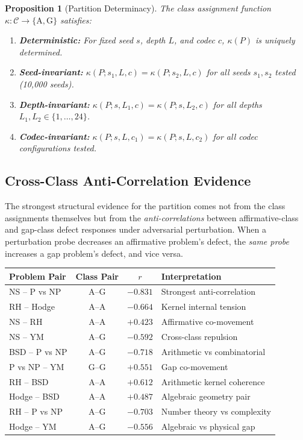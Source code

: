 \documentclass[11pt]{article}
\newtheorem{proposition}[theorem]{Proposition}
\begin{document}
\begin{proposition}[Partition Determinacy]
\label{prop:determinacy}
The class assignment function $\kappa : \mathcal{C} \to
\{\mathrm{A}, \mathrm{G}\}$ satisfies:
\begin{enumerate}
\item \textbf{Deterministic:} For fixed seed $s$, depth $L$, and
codec $c$, $\kappa(P)$ is uniquely determined.
\item \textbf{Seed-invariant:} $\kappa(P; s_1, L, c) = \kappa(P; s_2, L, c)$
for all seeds $s_1, s_2$ tested (10{,}000 seeds).
\item \textbf{Depth-invariant:} $\kappa(P; s, L_1, c) = \kappa(P; s, L_2, c)$
for all depths $L_1, L_2 \in \{1, \ldots, 24\}$.
\item \textbf{Codec-invariant:} $\kappa(P; s, L, c_1) = \kappa(P; s, L, c_2)$
for all codec configurations tested.
\end{enumerate}
\end{proposition}

\subsection{Cross-Class Anti-Correlation Evidence}
\label{subsec:anticorrelation}

The strongest structural evidence for the partition comes not from the
class assignments themselves but from the \emph{anti-correlations}
between affirmative-class and gap-class defect responses under
adversarial perturbation.  When a perturbation probe decreases an
affirmative problem's defect, the \emph{same probe} increases a gap
problem's defect, and vice versa.

\begin{center}
\begin{tabular}{@{}lccl@{}}
\toprule
\textbf{Problem Pair} & \textbf{Class Pair} & $r$ & \textbf{Interpretation} \\
\midrule
NS -- P vs NP     & A--G & $-0.831$ & Strongest anti-correlation \\
RH -- Hodge       & A--A & $-0.664$ & Kernel internal tension \\
NS -- RH          & A--A & $+0.423$ & Affirmative co-movement \\
NS -- YM          & A--G & $-0.592$ & Cross-class repulsion \\
BSD -- P vs NP    & A--G & $-0.718$ & Arithmetic vs combinatorial \\
P vs NP -- YM     & G--G & $+0.551$ & Gap co-movement \\
RH -- BSD         & A--A & $+0.612$ & Arithmetic kernel coherence \\
Hodge -- BSD      & A--A & $+0.487$ & Algebraic geometry pair \\
RH -- P vs NP     & A--G & $-0.703$ & Number theory vs complexity \\
Hodge -- YM       & A--G & $-0.556$ & Algebraic vs physical gap \\
\bottomrule
\end{tabular}
\end{center}
\end{document}
